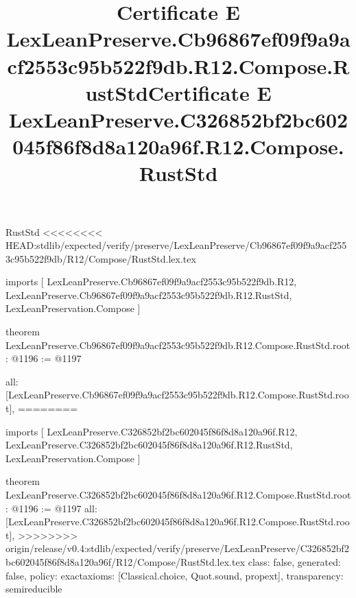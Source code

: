 \begin{lexlean}{RustStd}
<<<<<<<< HEAD:stdlib/expected/verify/preserve/LexLeanPreserve/Cb96867ef09f9a9acf2553c95b522f9db/R12/Compose/RustStd.lex.tex
\title{Certificate E LexLeanPreserve.Cb96867ef09f9a9acf2553c95b522f9db.R12.Compose.RustStd}
\begin{coremodule}
imports [
  LexLeanPreserve.Cb96867ef09f9a9acf2553c95b522f9db.R12,
  LexLeanPreserve.Cb96867ef09f9a9acf2553c95b522f9db.R12.RustStd,
  LexLeanPreservation.Compose
]

theorem LexLeanPreserve.Cb96867ef09f9a9acf2553c95b522f9db.R12.Compose.RustStd.root : @1196 := @1197 {
  all: [LexLeanPreserve.Cb96867ef09f9a9acf2553c95b522f9db.R12.Compose.RustStd.root],
========
\title{Certificate E LexLeanPreserve.C326852bf2bc602045f86f8d8a120a96f.R12.Compose.RustStd}
\begin{coremodule}
imports [
  LexLeanPreserve.C326852bf2bc602045f86f8d8a120a96f.R12,
  LexLeanPreserve.C326852bf2bc602045f86f8d8a120a96f.R12.RustStd,
  LexLeanPreservation.Compose
]

theorem LexLeanPreserve.C326852bf2bc602045f86f8d8a120a96f.R12.Compose.RustStd.root : @1196 := @1197 {
  all: [LexLeanPreserve.C326852bf2bc602045f86f8d8a120a96f.R12.Compose.RustStd.root],
>>>>>>>> origin/release/v0.4:stdlib/expected/verify/preserve/LexLeanPreserve/C326852bf2bc602045f86f8d8a120a96f/R12/Compose/RustStd.lex.tex
  class: false,
  generated: false,
  policy: exact{axioms: [Classical.choice, Quot.sound, propext]},
  transparency: semireducible
}


\end{coremodule}}
\end{coremodule}
\end{lexlean}
